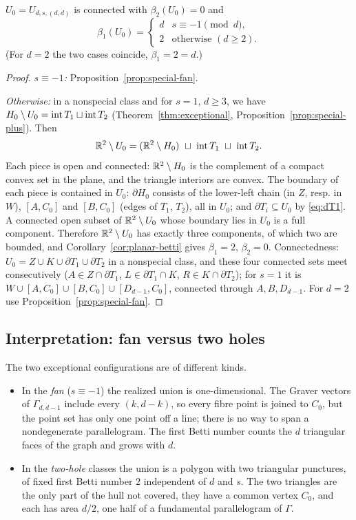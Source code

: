 \begin{theorem}\label{thm:betti}
$U_0=U_{d,s,(d,d)}$ is connected with $\beta_2(U_0)=0$ and
\[
  \beta_1(U_0)=\begin{cases}
  d & s\equiv-1\pmod d,\\
  2 & \text{otherwise }(d\ge2).
  \end{cases}
\]
(For $d=2$ the two cases coincide, $\beta_1=2=d$.)
\end{theorem}
\begin{proof}
\emph{$s\equiv-1$:} Proposition~\ref{prop:special-fan}.

\emph{Otherwise:} in a nonspecial class and for $s=1$, $d\ge3$, we have $H_0\setminus U_0=\operatorname{int} T_1\sqcup\operatorname{int} T_2$ (Theorem~\ref{thm:exceptional}, Proposition~\ref{prop:special-plus}). Then
\[
  \R^2\setminus U_0=(\R^2\setminus H_0)\ \sqcup\ \interior T_1\ \sqcup\ \interior T_2.
\]
Each piece is open and connected: $\mathbb R^2\setminus H_0$ is the complement of a compact convex set in the plane, and the triangle interiors are convex. The boundary of each piece is contained in $U_0$: $\partial H_0$ consists of the lower-left chain (in $Z$, resp. in $W$), $[A,C_0]$ and $[B,C_0]$ (edges of $T_1$, $T_2$), all in $U_0$; and $\partial T_i\subseteq U_0$ by \eqref{eq:dT1}. A connected open subset of $\mathbb R^2\setminus U_0$ whose boundary lies in $U_0$ is a full component. Therefore $\mathbb R^2\setminus U_0$ has exactly three components, of which two are bounded, and Corollary~\ref{cor:planar-betti} gives $\beta_1=2$, $\beta_2=0$. Connectedness: $U_0=Z\cup K\cup\partial T_1\cup\partial T_2$ in a nonspecial class, and these four connected sets meet consecutively ($A\in Z\cap\partial T_1$, $L\in\partial T_1\cap K$, $R\in K\cap\partial T_2$); for $s=1$ it is $W\cup[A,C_0]\cup[B,C_0]\cup[D_{d-1},C_0]$, connected through $A,B,D_{d-1}$. For $d=2$ use Proposition~\ref{prop:special-fan}.
\end{proof}

\subsection{Interpretation: fan versus two holes}

The two exceptional configurations are of different kinds.

\begin{itemize}
\item In the \emph{fan} ($s\equiv-1$) the realized union is one-dimensional. The Graver vectors of $\Gamma_{d,d-1}$ include every $(k,d-k)$, so every fibre point is joined to $C_0$, but the point set has only one point off a line; there is no way to span a nondegenerate parallelogram. The first Betti number counts the $d$ triangular faces of the graph and grows with $d$.
\item In the \emph{two-hole} classes the union is a polygon with two triangular punctures, of fixed first Betti number $2$ independent of $d$ and $s$. The two triangles are the only part of the hull not covered, they have a common vertex $C_0$, and each has area $d/2$, one half of a fundamental parallelogram of $\Gamma$.
\end{itemize}

